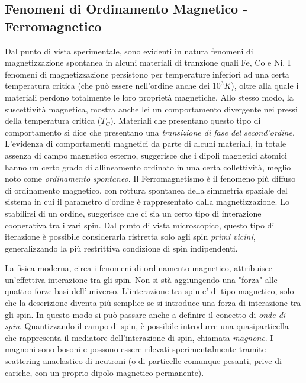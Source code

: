 \subsection{Fenomeni di Ordinamento Magnetico - Ferromagnetico}
Dal punto di vista sperimentale, sono evidenti in natura fenomeni di magnetizzazione spontanea in alcuni materiali di tranzione quali Fe, Co e Ni. I fenomeni di magnetizzazione persistono per temperature inferiori ad una certa temperatura critica (che pu\`o essere nell'ordine anche dei $10^3K$), oltre alla quale i materiali perdono totalmente le loro propriet\`a magnetiche. Allo stesso modo, la suscettivit\`a magnetica, mostra anche lei un comportamento divergente nei pressi della temperatura critica ($T_C$). Materiali che presentano questo tipo di comportamento si dice che presentano una \textit{transizione di fase del second'ordine}. L'evidenza di comportamenti magnetici da parte di alcuni materiali, in totale assenza di campo magnetico esterno, suggerisce che i dipoli magnetici atomici hanno un certo grado di allineamento ordinato in una certa collettivit\`a, meglio noto come \textit{ordinamento spontaneo}. Il Ferromagnetismo \`e il fenomeno  pi\`u diffuso di ordinamento magnetico, con rottura spontanea della simmetria spaziale del sistema in cui il parametro d'ordine \`e rappresentato dalla magnetizzazione. Lo stabilirsi di un ordine, suggerisce che ci sia un certo tipo di interazione cooperativa tra i vari spin. Dal punto di vista microscopico, questo tipo di iterazione \`e possibile considerarla ristretta solo agli spin \textit{primi vicini}, generalizzando la pi\`u restrittiva condizione di spin indipendenti.

La fisica moderna, circa i fenomeni di ordinamento magnetico, attribuisce un'effettiva interazione tra gli spin. Non si st\`a aggiungendo una "forza" alle quattro forze basi dell'universo. L'interazione tra spin e' di tipo magnetico, solo che la descrizione diventa pi\`u semplice se si introduce una forza di interazione tra gli spin. In questo modo si pu\`o passare anche a definire il concetto di \textit{onde di spin}. Quantizzando il campo di spin, \`e possibile introdurre una quasiparticella che rappresenta il mediatore dell'interazione di spin, chiamata \textit{magnone}. I magnoni sono bosoni e possono essere rilevati sperimentalmente tramite scattering anaelastico di neutroni (o di particelle comunque pesanti, prive di cariche, con un proprio dipolo magnetico permanente).
